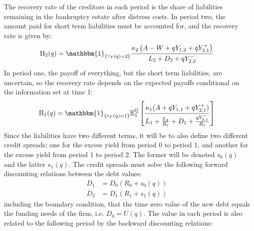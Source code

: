 \documentclass[main.tex]{subfiles}
\begin{document}
        The recovery rate of the creditors in each period
        is the share of liabilities remaining in the bankruptcy estate after distress costs.
        In period two, the amount paid for short term liabilities must be accounted for,
        and the recovery rate is given by:
        \begin{align}
            \Pi_{2}(q) 
            = 
            \mathbbm{1}_{\{\tau_{F}(q)=2\}}
            \frac{
                \kappa_2 \left(
                A - W + q Y_{1,2} + q Y_{2,1}^{+}
                \right)
            }{
                L_{2}
                +
                D_{2}
                +
                q Y_{2,2}^{-} 
            }
        \end{align}
        In period one, the payoff of everything, but the short term liabilities, are uncertain,
        so the recovery rate depends on the expected payoffs
        conditional on the information set at time 1:
        \begin{align}
            \Pi_{1}(q) 
            = 
            \mathbbm{1}_{\{\tau_{F}(q)=1\}}
            \mathbb{E}_{1}^{\rnmeasure}\left[
                \frac{
                    \kappa_1
                    (A + q Y_{1,1} + q Y_{2,1}^{+})
                }{
                    L_{1}
                    +
                    \frac{L_{2}}{R_{1}}
                    +
                    D_{1}
                    +
                    \frac{q Y_{2,1}^{-}}{R_{1}}
                }
            \right] 
        \end{align}
        Since the liabilities have two different terms, 
        it will be to also define two different credit spreads;
        one for the excess yield from period 0 to period 1,
        and another for the excess yield from period 1 to period 2.
        The former will be denoted $s_{0}(q)$ and the latter $s_{1}(q)$.
        The credit spreads must solve the following forward discounting relations
        between the debt values:
        \begin{align}
            D_{1} 
            &= 
            D_{0}(R_{0} + s_{0}(q)) \\
            D_{2} 
            &= 
            D_{1}(R_{1} + s_{1}(q))
        \end{align}
        including the boundary condition, that the time zero value of the new debt 
        equals the funding needs of the firm, i.e. $D_{0} = U(q)$.
        The value in each period is also related to the following period 
        by the backward discounting relations:
\end{document}
